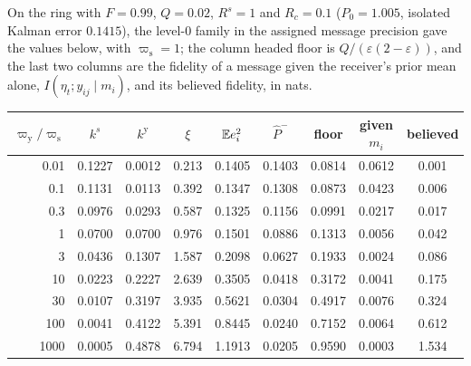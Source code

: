 \begin{numcheck}\label{chk:coh-grounding}
On the ring with $F=0.99$, $Q=0.02$, $R^s=1$ and $R_c=0.1$ ($P_0=1.005$, isolated Kalman error $0.1415$), the level-0 family in the assigned message precision gave the values below, with $\varpi_{\mathrm s}=1$; the column headed floor is $Q/(\varepsilon(2-\varepsilon))$, and the last two columns are the fidelity of a message given the receiver's prior mean alone, $I(\eta_t;y_{ij}\mid m_i)$, and its believed fidelity, in nats.
\begin{center}
\small
\begin{tabular}{@{}rcccccccc@{}}
\toprule
$\varpi_{\mathrm y}/\varpi_{\mathrm s}$ & $k^s$ & $k^{\mathrm y}$ & $\xi$ & $\mathbb{E} e_i^2$ & $\hat P^-$ & floor & given $m_i$ & believed \\
\midrule
0.01 & 0.1227 & 0.0012 & 0.213 & 0.1405 & 0.1403 & 0.0814 & 0.0612 & 0.001 \\
0.1 & 0.1131 & 0.0113 & 0.392 & 0.1347 & 0.1308 & 0.0873 & 0.0423 & 0.006 \\
0.3 & 0.0976 & 0.0293 & 0.587 & 0.1325 & 0.1156 & 0.0991 & 0.0217 & 0.017 \\
1 & 0.0700 & 0.0700 & 0.976 & 0.1501 & 0.0886 & 0.1313 & 0.0056 & 0.042 \\
3 & 0.0436 & 0.1307 & 1.587 & 0.2098 & 0.0627 & 0.1933 & 0.0024 & 0.086 \\
10 & 0.0223 & 0.2227 & 2.639 & 0.3505 & 0.0418 & 0.3172 & 0.0041 & 0.175 \\
30 & 0.0107 & 0.3197 & 3.935 & 0.5621 & 0.0304 & 0.4917 & 0.0076 & 0.324 \\
100 & 0.0041 & 0.4122 & 5.391 & 0.8445 & 0.0240 & 0.7152 & 0.0064 & 0.612 \\
1000 & 0.0005 & 0.4878 & 6.794 & 1.1913 & 0.0205 & 0.9590 & 0.0003 & 1.534 \\
\bottomrule
\end{tabular}
\end{center}

\end{numcheck}
